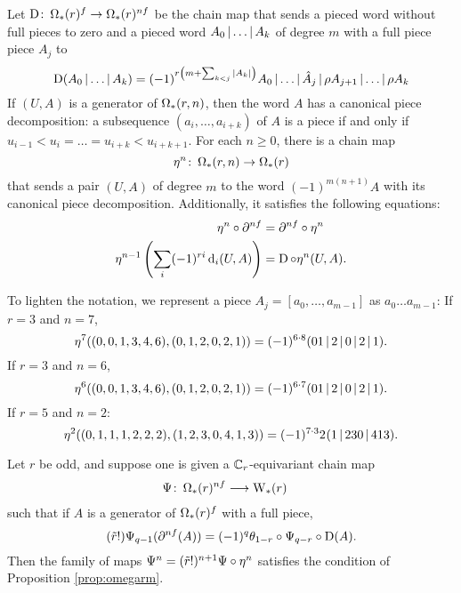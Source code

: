 Let $\operatorname{D} \colon  \operatorname{\Omega}_{*}(r)^{f}\to \operatorname{\Omega}_{*}(r)^{nf}$ be the chain map that sends a pieced word without full pieces to zero and a pieced word $A_0\operatorname{|}\ldots\operatorname{|} A_k$ of degree $m$ with a full piece piece $A_j$ to
\[
\operatorname{D}(A_0\operatorname{|} \ldots\operatorname{|} A_k) = (-1)^{r\left(m+\sum_{k<j} |A_k|\right)} A_0\operatorname{|} \ldots\operatorname{|} \hat{A}_{j}\operatorname{|} \rho A_{j+1}\operatorname{|} \ldots\operatorname{|} \rho A_k
\]
If $(U,A)$ is a generator of $\operatorname{\Omega}_{*}(r,n)$, then the word $A$ has a canonical piece decomposition: a subsequence $(a_i,\ldots,a_{i+k})$ of $A$ is a piece if and only if $u_{i-1}<u_i =\ldots= u_{i+k}<u_{i+k+1}$. For each $n\geq 0$, there is a chain map
\[\eta^n \colon  \operatorname{\Omega}_{*}(r,n)\to \operatorname{\Omega}_{*}(r)\]
that sends a pair $(U,A)$ of degree $m$ to the word $(-1)^{m(n+1)}A$ with its canonical piece decomposition. Additionally, it satisfies the following equations:
\begin{align}\label{eq:lambda2}
\eta^n\circ \partial^{nf} &= \partial^{nf}\circ \eta^n
\\
\label{eq:lambda0}
	\eta^{n-1}\left(\sum_i (-1)^{ri}\operatorname{d}_i(U,A)\right) &= \operatorname{D}\circ \eta^n(U,A).
\end{align}
%
\begin{example}\label{example:omegar} To lighten the notation, we represent a piece $A_j = [a_0,\ldots,a_{m-1}]$ as $a_0\ldots a_{m-1}$: If $r=3$ and $n=7$,
	\[
		\eta^7((0,0,1,3,4,6),(0,1,2,0,2,1)) = (-1)^{6\cdot 8}(01\operatorname{|} 2\operatorname{|} 0\operatorname{|} 2\operatorname{|} 1).
	\]
	If $r=3$ and $n=6$,
	\[
		\eta^6((0,0,1,3,4,6),(0,1,2,0,2,1)) = (-1)^{6\cdot 7}(01\operatorname{|} 2\operatorname{|} 0\operatorname{|} 2\operatorname{|} 1).
	\]
	If $r=5$ and $n=2$:
	\[
		\eta^2((0,1,1,1,2,2,2),(1,2,3,0,4,1,3)) = (-1)^{7\cdot 3} 2^{}(1\operatorname{|} 230\operatorname{|} 413).
	\]
\end{example}

\begin{lemma}\label{lemma:omegar}
	Let $r$ be odd, and suppose one is given a $\mathbb{C}_r$-equivariant chain map
	\begin{align*}
		\Psi \colon  \operatorname{\Omega}_{*}(r)^{nf}&\longrightarrow \operatorname{W}_{*}(r)
	\end{align*}
	such that if $A$ is a generator of $\operatorname{\Omega}_{*}(r)^{f}$ with a full piece,
	\begin{equation}\label{eq:lambda}
		(\tilde{r}!)\Psi_{q-1}(\partial^{nf} (A)) = (-1)^q\theta_{1-r}\circ\Psi_{q-r}\circ\operatorname{D}(A).
	\end{equation}
	Then the family of maps $\Psi^n = (\tilde{r}!)^{n+1}\Psi\circ \eta^n$ satisfies the condition of Proposition \ref{prop:omegarm}.
\end{lemma}

